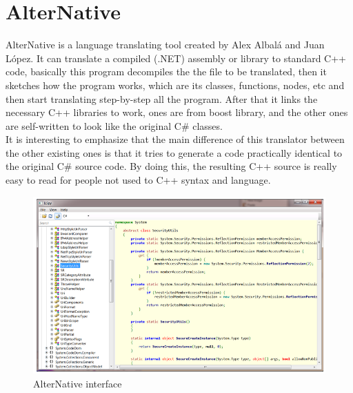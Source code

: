 \section{AlterNative}\label{S:Proposal-AlterNative}
AlterNative is a language translating tool created by Alex Albal\'{a} and Juan L\'{o}pez. It can translate a compiled (.NET) assembly or library to standard C++ code, basically this program decompiles the the file to be translated, then it sketches how the program works, which are its classes, functions, nodes, etc and then start translating step-by-step all the program. After that it links the necessary C++ libraries to work, ones are from boost library, and the other ones are self-written to look like the original C\# classes.
\\
It is interesting to emphasize that the main difference of this translator between the other existing ones is that it tries to generate a code practically identical to the original C\# source code. By doing this, the resulting C++ source is really easy to read for people not used to C++ syntax and language.
\begin{figure}[H]\begin{center}
 \centering
  \captionsetup{justification=centering}
 \includegraphics[scale=0.65]{pictures/proposal/alternativeUI}
  \caption{AlterNative interface \label{fig:Proposal-AN}}
\end{center}\end{figure}

